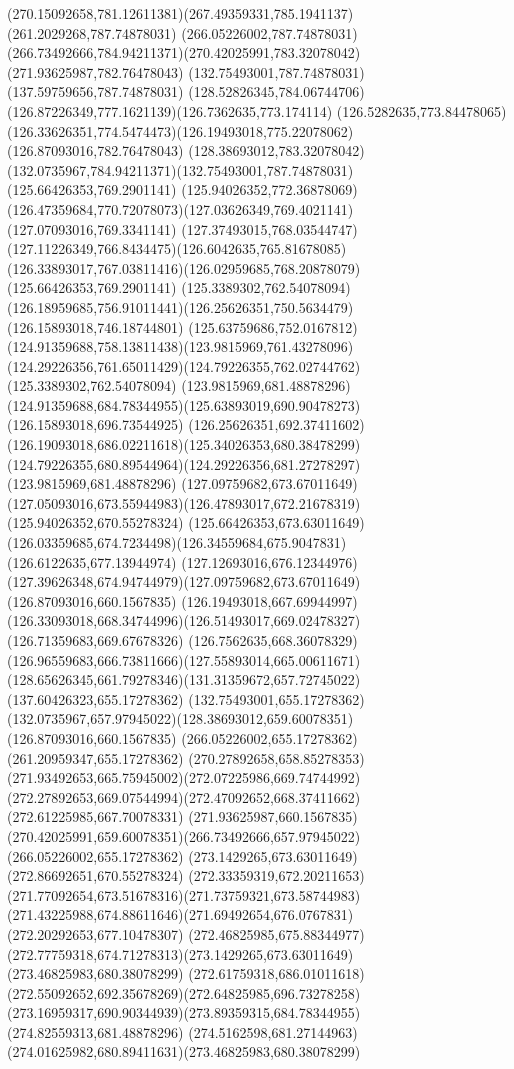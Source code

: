 {{{\curveto(270.15092658,781.12611381)(267.49359331,785.1941137)(261.2029268,787.74878031)
\lineto(266.05226002,787.74878031)
\curveto(266.73492666,784.94211371)(270.42025991,783.32078042)(271.93625987,782.76478043)
\moveto(132.75493001,787.74878031)
\lineto(137.59759656,787.74878031)
\curveto(128.52826345,784.06744706)(126.87226349,777.1621139)(126.7362635,773.174114)
\curveto(126.5282635,773.84478065)(126.33626351,774.5474473)(126.19493018,775.22078062)
\lineto(126.87093016,782.76478043)
\curveto(128.38693012,783.32078042)(132.0735967,784.94211371)(132.75493001,787.74878031)
\moveto(125.66426353,769.2901141)
\lineto(125.94026352,772.36878069)
\curveto(126.47359684,770.72078073)(127.03626349,769.4021141)(127.07093016,769.3341141)
\curveto(127.37493015,768.03544747)(127.11226349,766.8434475)(126.6042635,765.81678085)
\curveto(126.33893017,767.03811416)(126.02959685,768.20878079)(125.66426353,769.2901141)
\moveto(125.3389302,762.54078094)
\curveto(126.18959685,756.91011441)(126.25626351,750.5634479)(126.15893018,746.18744801)
\curveto(125.63759686,752.0167812)(124.91359688,758.13811438)(123.9815969,761.43278096)
\curveto(124.29226356,761.65011429)(124.79226355,762.02744762)(125.3389302,762.54078094)
\moveto(123.9815969,681.48878296)
\curveto(124.91359688,684.78344955)(125.63893019,690.90478273)(126.15893018,696.73544925)
\curveto(126.25626351,692.37411602)(126.19093018,686.02211618)(125.34026353,680.38478299)
\curveto(124.79226355,680.89544964)(124.29226356,681.27278297)(123.9815969,681.48878296)
\moveto(127.09759682,673.67011649)
\curveto(127.05093016,673.55944983)(126.47893017,672.21678319)(125.94026352,670.55278324)
\lineto(125.66426353,673.63011649)
\curveto(126.03359685,674.7234498)(126.34559684,675.9047831)(126.6122635,677.13944974)
\curveto(127.12693016,676.12344976)(127.39626348,674.94744979)(127.09759682,673.67011649)
\moveto(126.87093016,660.1567835)
\lineto(126.19493018,667.69944997)
\curveto(126.33093018,668.34744996)(126.51493017,669.02478327)(126.71359683,669.67678326)
\curveto(126.7562635,668.36078329)(126.96559683,666.73811666)(127.55893014,665.00611671)
\curveto(128.65626345,661.79278346)(131.31359672,657.72745022)(137.60426323,655.17278362)
\lineto(132.75493001,655.17278362)
\curveto(132.0735967,657.97945022)(128.38693012,659.60078351)(126.87093016,660.1567835)
\moveto(266.05226002,655.17278362)
\lineto(261.20959347,655.17278362)
\curveto(270.27892658,658.85278353)(271.93492653,665.75945002)(272.07225986,669.74744992)
\curveto(272.27892653,669.07544994)(272.47092652,668.37411662)(272.61225985,667.70078331)
\lineto(271.93625987,660.1567835)
\curveto(270.42025991,659.60078351)(266.73492666,657.97945022)(266.05226002,655.17278362)
\moveto(273.1429265,673.63011649)
\lineto(272.86692651,670.55278324)
\curveto(272.33359319,672.20211653)(271.77092654,673.51678316)(271.73759321,673.58744983)
\curveto(271.43225988,674.88611646)(271.69492654,676.0767831)(272.20292653,677.10478307)
\curveto(272.46825985,675.88344977)(272.77759318,674.71278313)(273.1429265,673.63011649)
\moveto(273.46825983,680.38078299)
\curveto(272.61759318,686.01011618)(272.55092652,692.35678269)(272.64825985,696.73278258)
\curveto(273.16959317,690.90344939)(273.89359315,684.78344955)(274.82559313,681.48878296)
\curveto(274.5162598,681.27144963)(274.01625982,680.89411631)(273.46825983,680.38078299)
}
}

}

